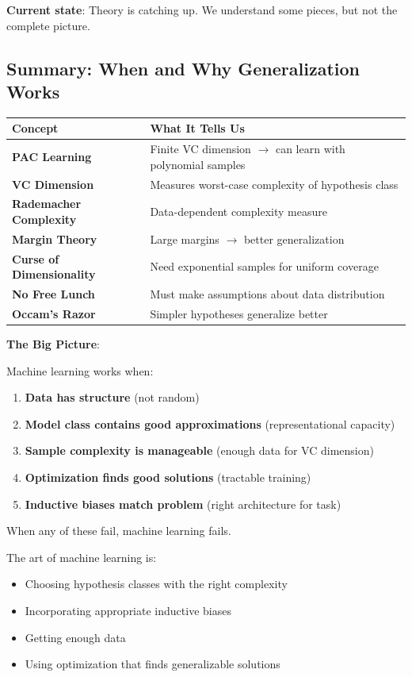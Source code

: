 \documentclass[11pt,oneside]{book}
\begin{document}
\textbf{Current state}: Theory is catching up. We understand some pieces, but not the complete picture.

\subsection{Summary: When and Why Generalization Works}

\begin{table}[h]
\centering
\begin{tabular}{ll}
\toprule
\textbf{Concept} & \textbf{What It Tells Us} \\
\midrule
\textbf{PAC Learning} & Finite VC dimension $\rightarrow$ can learn with polynomial samples \\
\textbf{VC Dimension} & Measures worst-case complexity of hypothesis class \\
\textbf{Rademacher Complexity} & Data-dependent complexity measure \\
\textbf{Margin Theory} & Large margins $\rightarrow$ better generalization \\
\textbf{Curse of Dimensionality} & Need exponential samples for uniform coverage \\
\textbf{No Free Lunch} & Must make assumptions about data distribution \\
\textbf{Occam's Razor} & Simpler hypotheses generalize better \\
\bottomrule
\end{tabular}
\end{table}

\textbf{The Big Picture}:

Machine learning works when:
\begin{enumerate}
    \item \textbf{Data has structure} (not random)
    \item \textbf{Model class contains good approximations} (representational capacity)
    \item \textbf{Sample complexity is manageable} (enough data for VC dimension)
    \item \textbf{Optimization finds good solutions} (tractable training)
    \item \textbf{Inductive biases match problem} (right architecture for task)
\end{enumerate}

When any of these fail, machine learning fails.

The art of machine learning is:
\begin{itemize}
    \item Choosing hypothesis classes with the right complexity
    \item Incorporating appropriate inductive biases
    \item Getting enough data
    \item Using optimization that finds generalizable solutions
\end{itemize}
\end{document}
